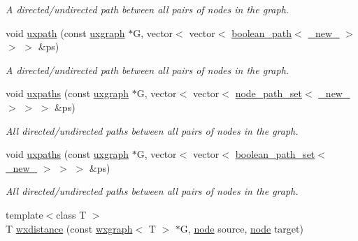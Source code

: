 \begin{DoxyCompactItemize}
\begin{DoxyCompactList}\small\item\em A directed/undirected path between all pairs of nodes in the graph. \end{DoxyCompactList}\item 
void \hyperlink{namespacelgraph_1_1traversal_a1f1940b51aef98c8b5be34aa3bc4a371}{uxpath} (const \hyperlink{classlgraph_1_1utils_1_1uxgraph}{uxgraph} $\ast$G, vector$<$ vector$<$ \hyperlink{classlgraph_1_1utils_1_1boolean__path}{boolean\+\_\+path}$<$ \hyperlink{namespacelgraph_1_1utils_a2c84bfde888c42ab3ad6b2cb8a364240}{\+\_\+new\+\_\+} $>$ $>$ $>$ \&ps)
\begin{DoxyCompactList}\small\item\em A directed/undirected path between all pairs of nodes in the graph. \end{DoxyCompactList}\item 
void \hyperlink{namespacelgraph_1_1traversal_a39a8bbdf96f484154d50e40f23021249}{uxpaths} (const \hyperlink{classlgraph_1_1utils_1_1uxgraph}{uxgraph} $\ast$G, vector$<$ vector$<$ \hyperlink{namespacelgraph_1_1utils_a723c115f9865edfab11a90377b9abef4}{node\+\_\+path\+\_\+set}$<$ \hyperlink{namespacelgraph_1_1utils_a2c84bfde888c42ab3ad6b2cb8a364240}{\+\_\+new\+\_\+} $>$ $>$ $>$ \&ps)
\begin{DoxyCompactList}\small\item\em All directed/undirected paths between all pairs of nodes in the graph. \end{DoxyCompactList}\item 
void \hyperlink{namespacelgraph_1_1traversal_a0e29db8163072d41c0dcc1b2e342d4bd}{uxpaths} (const \hyperlink{classlgraph_1_1utils_1_1uxgraph}{uxgraph} $\ast$G, vector$<$ vector$<$ \hyperlink{namespacelgraph_1_1utils_aaf50131e15d771a45620336d6e7a77f8}{boolean\+\_\+path\+\_\+set}$<$ \hyperlink{namespacelgraph_1_1utils_a2c84bfde888c42ab3ad6b2cb8a364240}{\+\_\+new\+\_\+} $>$ $>$ $>$ \&ps)
\begin{DoxyCompactList}\small\item\em All directed/undirected paths between all pairs of nodes in the graph. \end{DoxyCompactList}\item 
{\footnotesize template$<$class T $>$ }\\T \hyperlink{namespacelgraph_1_1traversal_a6f7355bc246be223e074d737810f2fb4}{wxdistance} (const \hyperlink{classlgraph_1_1utils_1_1wxgraph}{wxgraph}$<$ T $>$ $\ast$G, \hyperlink{namespacelgraph_1_1utils_ab9c6b34241f0b68372c55f34c460e863}{node} source, \hyperlink{namespacelgraph_1_1utils_ab9c6b34241f0b68372c55f34c460e863}{node} target)

\end{DoxyCompactItemize}
